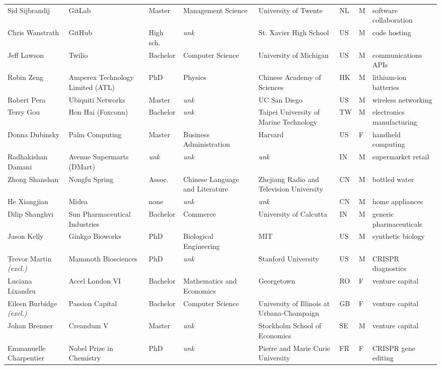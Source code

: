 \documentclass[11pt]{article}
\begin{document}
\begin{longtable}{@{}p{2.4cm}p{2.5cm}p{1.35cm}p{1.9cm}p{2.1cm}p{0.5cm}p{0.45cm}p{2.2cm}@{}}
Sid Sijbrandij & GitLab & Master & Management Science & University of Twente & NL & M & software collaboration \\
Chris Wanstrath & GitHub & High sch. & \textit{unk} & St. Xavier High School & US & M & code hosting \\
Jeff Lawson & Twilio & Bachelor & Computer Science & University of Michigan & US & M & communications APIs \\
Robin Zeng & Amperex Technology Limited (ATL) & PhD & Physics & Chinese Academy of Sciences & HK & M & lithium-ion batteries \\
Robert Pera & Ubiquiti Networks & Master & \textit{unk} & UC San Diego & US & M & wireless networking \\
Terry Gou & Hon Hai (Foxconn) & Bachelor & \textit{unk} & Taipei University of Marine Technology & TW & M & electronics manufacturing \\
Donna Dubinsky & Palm Computing & Master & Business Administration & Harvard & US & F & handheld computing \\
Radhakishan Damani & Avenue Supermarts (DMart) & \textit{unk} & \textit{unk} & \textit{unk} & IN & M & supermarket retail \\
Zhong Shanshan & Nongfu Spring & Assoc. & Chinese Language and Literature & Zhejiang Radio and Television University & CN & M & bottled water \\
He Xiangjian & Midea & none & \textit{unk} & \textit{unk} & CN & M & home appliances \\
Dilip Shanghvi & Sun Pharmaceutical Industries & Bachelor & Commerce & University of Calcutta & IN & M & generic pharmaceuticals \\
Jason Kelly & Ginkgo Bioworks & PhD & Biological Engineering & MIT & US & M & synthetic biology \\
Trevor Martin \textit{\scriptsize(excl.)} & Mammoth Biosciences & PhD & \textit{unk} & Stanford University & US & M & CRISPR diagnostics \\
Luciana Lixandru & Accel London VI & Bachelor & Mathematics and Economics & Georgetown & RO & F & venture capital \\
Eileen Burbidge \textit{\scriptsize(excl.)} & Passion Capital & Bachelor & Computer Science & University of Illinois at Urbana-Champaign & GB & F & venture capital \\
Johan Brenner & Creandum V & Master & \textit{unk} & Stockholm School of Economics & SE & M & venture capital \\
Emmanuelle Charpentier & Nobel Prize in Chemistry & PhD & \textit{unk} & Pierre and Marie Curie University & FR & F & CRISPR gene editing \\

\end{longtable}
\end{document}
